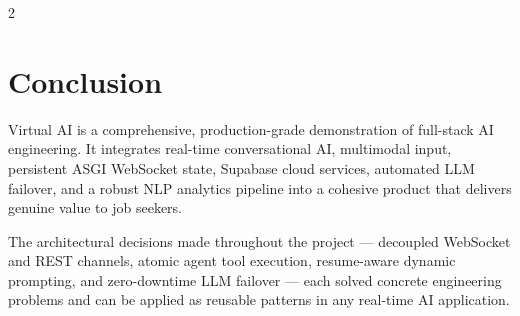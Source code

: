\documentclass[10pt, a4paper]{article}
\begin{document}
\begin{multicols}{2}
\section{Conclusion}

Virtual AI is a comprehensive, production-grade demonstration of
full-stack AI engineering. It integrates real-time conversational AI,
multimodal input, persistent ASGI WebSocket state, Supabase cloud
services, automated LLM failover, and a robust NLP analytics pipeline
into a cohesive product that delivers genuine value to job seekers.

The architectural decisions made throughout the project --- decoupled
WebSocket and REST channels, atomic agent tool execution, resume-aware
dynamic prompting, and zero-downtime LLM failover --- each solved concrete
engineering problems and can be applied as reusable patterns in any
real-time AI application.

\end{multicols}
\end{document}
